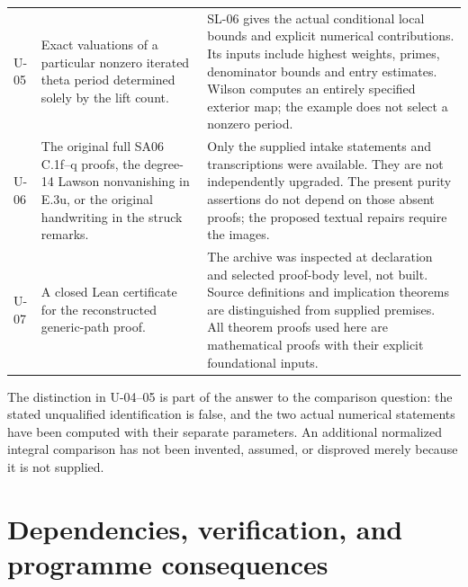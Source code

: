 \begin{longtable}{@{}p{}p{}p{}@{}}
U-05 & Exact valuations of a particular nonzero iterated theta period determined solely by the lift count. & SL-06 gives the actual conditional local bounds and explicit numerical contributions. Its inputs include highest weights, primes, denominator bounds and entry estimates. Wilson computes an entirely specified exterior map; the example does not select a nonzero period.\\
U-06 & The original full SA06 C.1f--q proofs, the degree-14 Lawson nonvanishing in E.3u, or the original handwriting in the struck remarks. & Only the supplied intake statements and transcriptions were available. They are not independently upgraded. The present purity assertions do not depend on those absent proofs; the proposed textual repairs require the images.\\
U-07 & A closed Lean certificate for the reconstructed generic-path proof. & The archive was inspected at declaration and selected proof-body level, not built. Source definitions and implication theorems are distinguished from supplied premises. All theorem proofs used here are mathematical proofs with their explicit foundational inputs.\\
\bottomrule
\end{longtable}

The distinction in U-04--05 is part of the answer to the comparison
question: the stated unqualified identification is false, and the two
actual numerical statements have been computed with their separate
parameters.  An additional normalized integral comparison has not been
invented, assumed, or disproved merely because it is not supplied.

\section{Dependencies, verification, and programme consequences}

